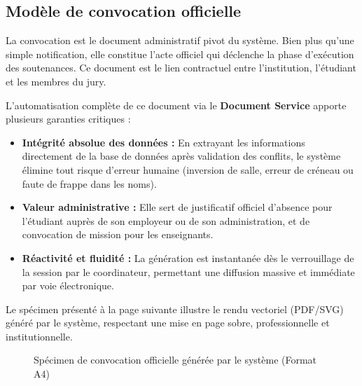 \documentclass[12pt,a4paper]{article}
\begin{document}
\subsection{Modèle de convocation officielle}
\label{subsec:convocation_doc}

La convocation est le document administratif pivot du système. Bien plus qu'une simple notification, elle constitue l'acte officiel qui déclenche la phase d'exécution des soutenances. Ce document est le lien contractuel entre l'institution, l'étudiant et les membres du jury.

L'automatisation complète de ce document via le \textbf{Document Service} apporte plusieurs garanties critiques :
\begin{itemize}
    \item \textbf{Intégrité absolue des données :} En extrayant les informations directement de la base de données après validation des conflits, le système élimine tout risque d'erreur humaine (inversion de salle, erreur de créneau ou faute de frappe dans les noms).
    \item \textbf{Valeur administrative :} Elle sert de justificatif officiel d'absence pour l'étudiant auprès de son employeur ou de son administration, et de convocation de mission pour les enseignants.
    \item \textbf{Réactivité et fluidité :} La génération est instantanée dès le verrouillage de la session par le coordinateur, permettant une diffusion massive et immédiate par voie électronique.
\end{itemize}

Le spécimen présenté à la page suivante illustre le rendu vectoriel (PDF/SVG) généré par le système, respectant une mise en page sobre, professionnelle et institutionnelle.

\newpage
\begin{figure}[H]
    \centering
    
    \caption{Spécimen de convocation officielle générée par le système (Format A4)}
\end{figure}
\end{document}
